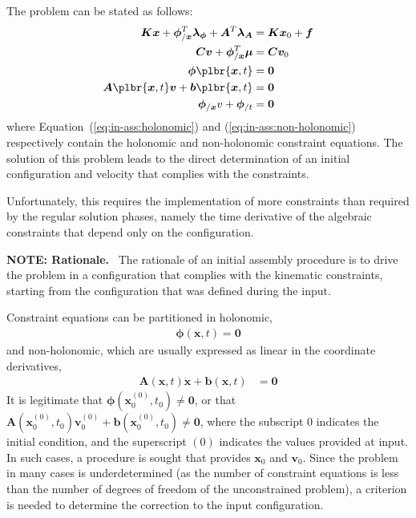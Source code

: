 \documentclass[10pt,fleqn,subeqn]{report}
\newcommand{\T}[1]{\bm{#1}}
\newcommand{\TT}[1]{\bm{#1}}
\begin{document}
The problem can be stated as follows:
\begin{align}
	\TT{K} \T{x} + \T{\phi}_{/\T{x}}^T \T{\lambda}_{\T{\phi}} + \TT{A}^T \T{\lambda}_{\TT{A}}
		& = \TT{K} \T{x}_0 + \T{f} \\
	\TT{C} \T{v} + \T{\phi}_{/\T{x}}^T \T{\mu} & = \TT{C} \T{v}_0 \\
	\T{\phi}\plbr{\T{x}, t} & = \T{0} \label{eq:in-ass:holonomic} \\
	\TT{A}\plbr{\T{x}, t} \T{v} + \T{b}\plbr{\T{x}, t} & = \T{0} \label{eq:in-ass:non-holonomic} \\
	\T{\phi}_{/\T{x}} v + \T{\phi}_{/t} & = \T{0}
\end{align}
where Equation~(\ref{eq:in-ass:holonomic}) and (\ref{eq:in-ass:non-holonomic})
respectively contain the holonomic and non-holonomic constraint equations.
The solution of this problem leads to the direct determination
of an initial configuration and velocity that complies 
with the constraints.

Unfortunately, this requires the implementation of more constraints
than required by the regular solution phases, namely the time derivative
of the algebraic constraints that depend only on the configuration.

\bigskip



\textbf{NOTE: Rationale.} \
The rationale of an initial assembly procedure is to drive the problem
in a configuration that complies with the kinematic constraints,
starting from the configuration that was defined during the input.

Constraint equations can be partitioned in holonomic,
\begin{align}
	\T{\phi}(\T{x}, t) = \T{0}
\end{align}
and non-holonomic, which are usually expressed as linear in the coordinate derivatives,
\begin{align}
	\TT{A}(\T{x}, t) \dot{\T{x}} + \T{b}(\T{x}, t) &= \T{0}
\end{align}
It is legitimate that $\T{\phi}(\T{x}_0^{(0)}, t_0) \neq \T{0}$,
or that $\TT{A}(\T{x}_0^{(0)}, t_0) \T{v}_0^{(0)} + \T{b}(\T{x}_0^{(0)}, t_0) \neq \T{0}$,
where the subscript $0$ indicates the initial condition,
and the superscript $(0)$ indicates the values provided at input.
In such cases, a procedure is sought that provides $\T{x}_0$ and $\T{v}_0$.
Since the problem in many cases is underdetermined
(as the number of constraint equations is less than the number
of degrees of freedom of the unconstrained problem),
a criterion is needed to determine the correction to the input configuration.
\end{document}
